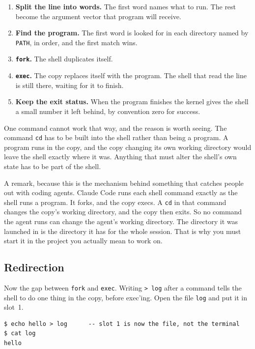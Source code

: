 \documentclass[11pt,a4paper]{article}
\begin{document}
\begin{enumerate}
\item \textbf{Split the line into words.} The first word names what to run. The rest become the
      argument vector that program will receive.
\item \textbf{Find the program.} The first word is looked for in each directory named by
      \texttt{PATH}, in order, and the first match wins.
\item \textbf{\texttt{fork}.} The shell duplicates itself.
\item \textbf{\texttt{exec}.} The copy replaces itself with the program. The shell that read
      the line is still there, waiting for it to finish.
\item \textbf{Keep the exit status.} When the program finishes the kernel gives the shell a
      small number it left behind, by convention zero for success.
\end{enumerate}

One command cannot work that way, and the reason is worth seeing. The command \texttt{cd} has to be built
into the shell rather than being a program. A program runs in the copy, and the copy changing its
own working directory would leave the shell exactly where it was. Anything that must alter the
shell's own state has to be part of the shell.

A remark, because this is the mechanism behind something that catches people out with coding
agents. Claude Code runs each shell command exactly as the shell runs a program. It forks, and the
copy execs. A \texttt{cd} in that command changes the copy's working directory, and the copy then
exits. So no command the agent runs can change the agent's working directory. The directory it was
launched in is the directory it has for the whole session. That is why you must start it in the project you
actually mean to work on.

\subsection{Redirection}

Now the gap between \texttt{fork} and \texttt{exec}. Writing \texttt{> log} after a command tells
the shell to do one thing in the copy, before exec'ing. Open the file \texttt{log} and put it in
slot~1.

\begin{lstlisting}[language=SH]
$ echo hello > log      -- slot 1 is now the file, not the terminal
$ cat log
hello
\end{lstlisting}
\end{document}
